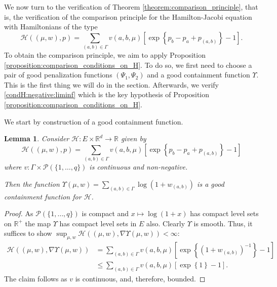 \documentclass[a4paper]{article}
\newcommand{\cH}{\mathcal{H}}
\newcommand{\cP}{\mathcal{P}}
\newcommand{\bR}{\mathbb{R}}
\numberwithin{equation}{section}
\newtheorem{lemma}[theorem]{Lemma}
\theoremstyle{definition}
\begin{document}
We now turn to the verification of Theorem \ref{theorem:comparison_principle}, that is, the verification of the comparison principle for the Hamilton-Jacobi equation with Hamiltonians of the type
\begin{equation*}
	\cH((\mu,w),p) = \sum_{(a,b) \in \Gamma} v(a,b,\mu)\left[\exp\left\{p_b - p _a + p_{(a,b)} \right\} - 1 \right].
\end{equation*}
To obtain the comparison principle, we aim to apply Proposition \ref{proposition:comparison_conditions_on_H}. To do so, we first need to choose a pair of good penalization functions $(\Psi_1,\Psi_2)$ and a good containment function $\Upsilon$. This is the first thing we will do in the section. Afterwards, we verify \eqref{condH:negative:liminf} which is the key hypothesis of Proposition \ref{proposition:comparison_conditions_on_H}. 

\smallskip

We start by construction of a good containment function.

\begin{lemma} \label{lemma:explicit_good_containment_function}
	Consider $\cH :  E \times  \bR^d \rightarrow \bR$ given by
	\begin{equation*}
		\cH((\mu,w),p) =  \sum_{(a,b) \in \Gamma} v(a,b,\mu)\left[\exp\left\{p_b - p _a + p_{(a,b)} \right\} - 1 \right]
	\end{equation*}
	where $v : \Gamma \times \cP(\{1,\dots,q\})$ is continuous and non-negative.
	
	Then the function $\Upsilon(\mu,w) = \sum_{(a,b) \in \Gamma} \log \left( 1 + w_{(a,b)}\right)$ is a good containment function for $\cH$.
\end{lemma}

\begin{proof}
	As $\cP(\{1,\dots,q\})$ is compact and $x \mapsto \log(1+x)$ has compact level sets on $\bR^+$ the map $\Upsilon$ has compact level sets in $E$ also. Clearly $\Upsilon$ is smooth. Thus, it suffices to show $\sup_{\mu,w} \cH((\mu,w),\nabla \Upsilon(\mu,w)) < \infty$:
	\begin{align*}
		\cH((\mu,w), \nabla \Upsilon(\mu,w)) & =  \sum_{(a,b) \in \Gamma} v(a,b,\mu)\left[\exp\left\{(1 + w_{(a,b)})^{-1} \right\} - 1 \right] \\
		& \leq  \sum_{(a,b) \in \Gamma} v(a,b,\mu)\left[\exp\left\{1 \right\} - 1 \right].
	\end{align*}
	The claim follows as $v$ is continuous, and, therefore, bounded.
\end{proof}
\end{document}
